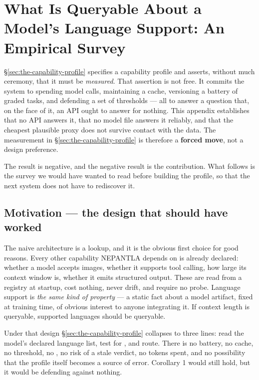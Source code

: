 \appendix

\section{What Is Queryable About a Model's Language Support: An Empirical
Survey}
\label{sec:appendix-capabilities}

\S\ref{sec:the-capability-profile} specifies a capability profile and asserts,
without much ceremony, that it must be \emph{measured}. That assertion is not
free. It commits the system to spending model calls, maintaining a cache,
versioning a battery of graded tasks, and defending a set of thresholds --- all
to answer a question that, on the face of it, an API ought to answer for
nothing. This appendix establishes that no API answers it, that no model file
answers it reliably, and that the cheapest plausible proxy does not survive
contact with the data. The measurement in \S\ref{sec:the-capability-profile} is
therefore a \textbf{forced move}, not a design preference.

The result is negative, and the negative result is the contribution. What
follows is the survey we would have wanted to read before building the profile,
so that the next system does not have to rediscover it.

\subsection{Motivation --- the design that should have worked}
\label{sec:appendix-motivation}

The naive architecture is a lookup, and it is the obvious first choice for good
reasons. Every other capability NEPANTLA depends on is already declared:
whether a model accepts images, whether it supports tool calling, how large its
context window is, whether it emits structured output. These are read from a
registry at startup, cost nothing, never drift, and require no probe. Language
support is \emph{the same kind of property} --- a static fact about a model
artifact, fixed at training time, of obvious interest to anyone integrating it.
If context length is queryable, supported languages should be queryable.

Under that design \S\ref{sec:the-capability-profile} collapses to three lines:
read the model's declared language list, test for , and route. There is
no battery, no cache, no threshold, no , no risk of a stale
verdict, no tokens spent, and no possibility that the profile itself becomes a
source of error. Corollary 1 would still hold, but it would be defending against
nothing.

